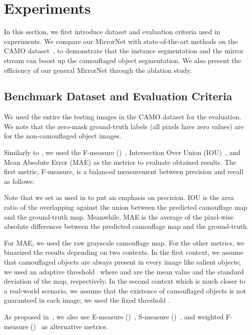 \documentclass[journal]{IEEEtran}
\begin{document}
\section{Experiments}
\label{sec:results}
In this section, we first introduce dataset and evaluation criteria used in experiments.  We compare our MirrorNet with state-of-the-art methods on the CAMO dataset~\cite{CAMO}, to demonstrate that the instance segmentation and the mirror stream can boost up the camouflaged object segmentation. We also present the efficiency of our general MirrorNet through the ablation study.

\subsection{Benchmark Dataset and Evaluation Criteria}




We used the entire the testing images in the CAMO dataset for the evaluation. We note that the zero-mask ground-truth labels (all pixels have zero values) are for the non-camouflaged object images. 

Similarly to \cite{CAMO}, we used the F-measure ()~\cite{Achanta-CVPR2009}, Intersection Over Union (IOU)~\cite{Long-ICCV2015}, and Mean Absolute Error (MAE) as the metrics to evaluate obtained results. The first metric, F-measure, is a balanced measurement between precision and recall as follows: 

Note that we set  as used in \cite{Achanta-CVPR2009,AH} to put an emphasis on precision. 
IOU is the area ratio of the overlapping against the union between the predicted camouflage map and the ground-truth map. Meanwhile, MAE is the average of the pixel-wise absolute differences between the predicted camouflage map and the ground-truth.

For MAE, we used the raw grayscale camouflage map. For the other metrics, we binarized the results depending on two contexts. In the first context, we assume that camouflaged objects are always present in every image like salient objects; we used an adaptive threshold~\cite{Jia-ICCV2013}  where  and  are the mean value and the standard deviation of the map, respectively. In the second context which is much closer to a real-world scenario, we assume that the existence of camouflaged objects is not guaranteed in each image; we used the fixed threshold .

As proposed in~\cite{sinet}, we also use E-measure ()~\cite{ephi},  S-measure ()~\cite{smeasure}, and weighted F-measure ()~\cite{weightedf} as alternative metrics.
\end{document}
